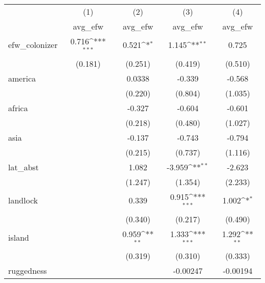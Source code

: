{
\def\sym#1{\ifmmode^{#1}\else\(^{#1}\)\fi}
\begin{tabular}{l*{4}{c}}
\hline\hline
            &\multicolumn{1}{c}{(1)}&\multicolumn{1}{c}{(2)}&\multicolumn{1}{c}{(3)}&\multicolumn{1}{c}{(4)}\\
            &\multicolumn{1}{c}{avg\_efw}&\multicolumn{1}{c}{avg\_efw}&\multicolumn{1}{c}{avg\_efw}&\multicolumn{1}{c}{avg\_efw}\\
\hline
efw\_colonizer&       0.716\sym{***}&       0.521\sym{*}  &       1.145\sym{**} &       0.725         \\
            &     (0.181)         &     (0.251)         &     (0.419)         &     (0.510)         \\
[1em]
america     &                     &      0.0338         &      -0.339         &      -0.568         \\
            &                     &     (0.220)         &     (0.804)         &     (1.035)         \\
[1em]
africa      &                     &      -0.327         &      -0.604         &      -0.601         \\
            &                     &     (0.218)         &     (0.480)         &     (1.027)         \\
[1em]
asia        &                     &      -0.137         &      -0.743         &      -0.794         \\
            &                     &     (0.215)         &     (0.737)         &     (1.116)         \\
[1em]
lat\_abst    &                     &       1.082         &      -3.959\sym{**} &      -2.623         \\
            &                     &     (1.247)         &     (1.354)         &     (2.233)         \\
[1em]
landlock    &                     &       0.339         &       0.915\sym{***}&       1.002\sym{*}  \\
            &                     &     (0.340)         &     (0.217)         &     (0.490)         \\
[1em]
island      &                     &       0.959\sym{**} &       1.333\sym{***}&       1.292\sym{**} \\
            &                     &     (0.319)         &     (0.310)         &     (0.333)         \\
[1em]
ruggedness  &                     &                     &    -0.00247         &    -0.00194         \\

\end{tabular}}
